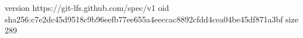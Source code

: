 version https://git-lfs.github.com/spec/v1
oid sha256:c7e2dc45d9518c9b96eefb77ee655a4eeccac8892cfdd4cea04be45df871a3bf
size 289
